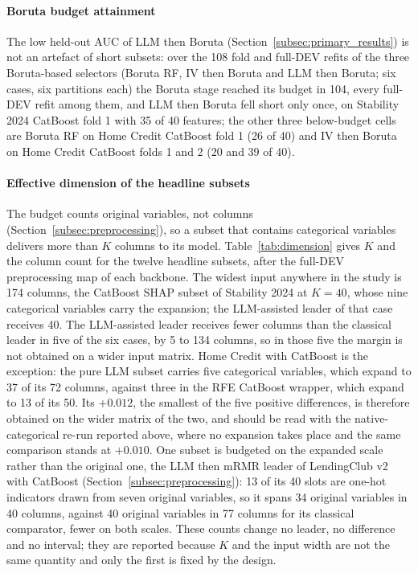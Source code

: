 \documentclass[final,5p,twocolumn]{elsarticle}
\newcommand{\Kfeat}{K}
\providecommand{\DIFaddtex}[1]{{\protect\color{blue} \sf #1}} %
\providecommand{\DIFaddFL}[1]{\DIFadd{#1}} %
\providecommand{\DIFadd}[1]{\texorpdfstring{\DIFaddtex{#1}}{#1}} %
\begin{document}
\paragraph{\DIFaddFL{Boruta budget attainment}}
\DIFaddFL{The low held-out AUC of LLM then Boruta (Section~\ref{subsec:primary_results}) is not an artefact of short subsets: over the 108 fold and full-DEV refits of the three Boruta-based selectors (Boruta RF, IV then Boruta and LLM then Boruta; six cases, six partitions each) the Boruta stage reached its budget in 104, every full-DEV refit among them, and LLM then Boruta fell short only once, on Stability 2024 CatBoost fold 1 with 35 of 40 features; the other three below-budget cells are Boruta RF on Home Credit CatBoost fold 1 (26 of 40) and IV then Boruta on Home Credit CatBoost folds 1 and 2 (20 and 39 of 40).
}

\paragraph{\DIFaddFL{Effective dimension of the headline subsets}}
\DIFaddFL{The budget counts original variables, not columns (Section~\ref{subsec:preprocessing}), so a subset that contains categorical variables delivers more than $\Kfeat$ columns to its model. Table~\ref{tab:dimension} gives $\Kfeat$ and the column count for the twelve headline subsets, after the full-DEV preprocessing map of each backbone. The widest input anywhere in the study is 174 columns, the CatBoost SHAP subset of Stability 2024 at $\Kfeat=40$, whose nine categorical variables carry the expansion; the LLM-assisted leader of that case receives 40. The LLM-assisted leader receives fewer columns than the classical leader in five of the six cases, by 5 to 134 columns, so in those five the margin is not obtained on a wider input matrix. Home Credit with CatBoost is the exception: the pure LLM subset carries five categorical variables, which expand to 37 of its 72 columns, against three in the RFE CatBoost wrapper, which expand to 13 of its 50. Its $+0.012$, the smallest of the five positive differences, is therefore obtained on the wider matrix of the two, and should be read with the native-categorical re-run reported above, where no expansion takes place and the same comparison stands at $+0.010$. One subset is budgeted on the expanded scale rather than the original one, the LLM then mRMR leader of LendingClub v2 with CatBoost (Section~\ref{subsec:preprocessing}): 13 of its 40 slots are one-hot indicators drawn from seven original variables, so it spans 34 original variables in 40 columns, against 40 original variables in 77 columns for its classical comparator, fewer on both scales. These counts change no leader, no difference and no interval; they are reported because $\Kfeat$ and the input width are not the same quantity and only the first is fixed by the design.
}
\end{document}
